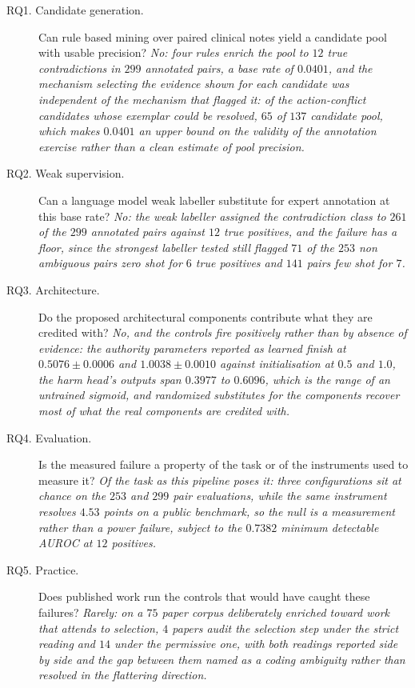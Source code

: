\begin{description}

\item[RQ1. Candidate generation.] Can rule based mining over paired clinical
notes yield a candidate pool with usable precision?
\emph{No: four rules enrich the pool to $12$ true contradictions in $299$
annotated pairs, a base rate of $0.0401$, and the mechanism selecting the
evidence shown for each candidate was independent of the mechanism that flagged
it: of the action-conflict candidates whose exemplar could be resolved, $65$ of $137$
candidate pool, which makes $0.0401$ an upper bound on the validity of the
annotation exercise rather than a clean estimate of pool precision.}

\item[RQ2. Weak supervision.] Can a language model weak labeller substitute for
expert annotation at this base rate?
\emph{No: the weak labeller assigned the contradiction class to $261$ of the
$299$ annotated pairs against $12$ true positives, and the failure has a floor,
since the strongest labeller tested still flagged $71$ of the $253$ non
ambiguous pairs zero shot for $6$ true positives and $141$ pairs few shot for
$7$.}

\item[RQ3. Architecture.] Do the proposed architectural components contribute
what they are credited with?
\emph{No, and the controls fire positively rather than by absence of evidence:
the authority parameters reported as learned finish at $0.5076 \pm 0.0006$ and
$1.0038 \pm 0.0010$ against initialisation at $0.5$ and $1.0$, the harm head's
outputs span $0.3977$ to $0.6096$, which is the range of an untrained sigmoid,
and randomized substitutes for the components recover most of what the real
components are credited with.}

\item[RQ4. Evaluation.] Is the measured failure a property of the task or of the
instruments used to measure it?
\emph{Of the task as this pipeline poses it: three configurations sit at chance
on the $253$ and $299$ pair evaluations, while the same instrument resolves
$4.53$ points on a public benchmark, so the null is a measurement rather than a
power failure, subject to the $0.7382$ minimum detectable AUROC at $12$
positives.}

\item[RQ5. Practice.] Does published work run the controls that would have
caught these failures?
\emph{Rarely: on a $75$ paper corpus deliberately enriched toward work that
attends to selection, $4$ papers audit the selection step under the strict
reading and $14$ under the permissive one, with both readings reported side by
side and the gap between them named as a coding ambiguity rather than resolved
in the flattering direction.}

\end{description}

